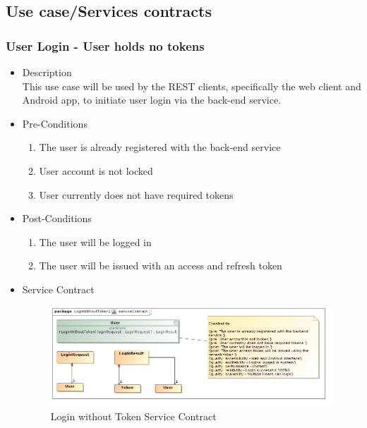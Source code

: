 \documentclass[a4paper,10pt]{article}
\begin{document}
\subsection{Use case/Services contracts}
\subsubsection{User Login - User holds no tokens}
	\begin{itemize}
		\item Description\\
		This use case will be used by the REST clients, specifically the web client and Android app, to initiate user login via the back-end service. 
		\item Pre-Conditions
			\begin{enumerate}
				\item The user is already registered with the back-end service
				\item User account is not locked
				\item User currently does not have required tokens
			\end{enumerate}
		\item Post-Conditions
			\begin{enumerate}
				\item The user will be logged in
				\item The user will be issued with an access and refresh token	
			\end{enumerate}
		\item Service Contract
			\begin{figure}[H]
				\includegraphics[scale=0.5]{loginWithoutToken}
				\caption{Login without Token Service Contract}
			\end{figure}
	\end{itemize}
	
\end{document}
